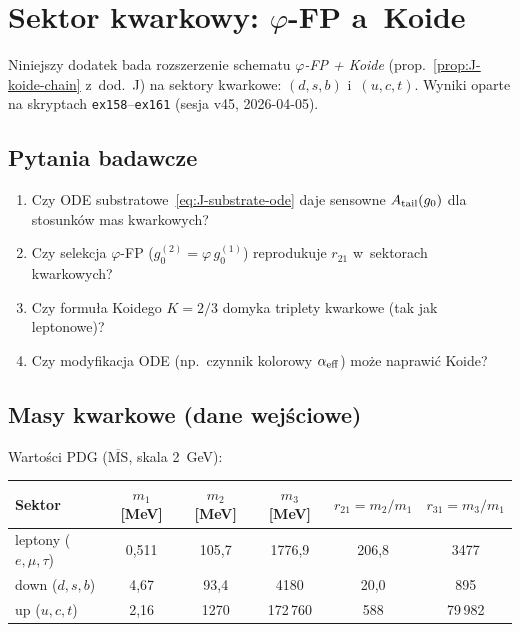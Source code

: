 \section{Sektor kwarkowy: $\varphi$-FP a~Koide}%
\label{app:quark-sector}

Niniejszy dodatek bada rozszerzenie schematu \emph{$\varphi$-FP + Koide}
(prop.~\ref{prop:J-koide-chain} z~dod.~J) na sektory kwarkowe:
$(d, s, b)$ i~$(u, c, t)$.
Wyniki oparte na skryptach \texttt{ex158}--\texttt{ex161}
(sesja v45, 2026-04-05).

\subsection{Pytania badawcze}\label{app:X-pytania}

\begin{enumerate}[nosep]
  \item Czy ODE substratowe~\eqref{eq:J-substrate-ode} daje sensowne
        $A_{\rm tail}(g_0)$ dla stosunków mas kwarkowych?
  \item Czy selekcja $\varphi$-FP ($g_0^{(2)} = \varphi\,g_0^{(1)}$)
        reprodukuje $r_{21}$ w~sektorach kwarkowych?
  \item Czy formuła Koidego $K = 2/3$ domyka triplety kwarkowe
        (tak jak lepton\-owe)?
  \item Czy modyfikacja ODE (np.\ czynnik kolorowy $\alpha_{\rm eff}$)
        może naprawić Koide?
\end{enumerate}

\subsection{Masy kwarkowe (dane wejściowe)}\label{app:X-masy}

Warto\'sci PDG ($\overline{\text{MS}}$, skala 2~GeV):
\begin{center}\footnotesize
\begin{tabular}{@{}lccccc@{}}
\toprule
Sektor & $m_1$ [MeV] & $m_2$ [MeV] & $m_3$ [MeV]
       & $r_{21} = m_2/m_1$ & $r_{31} = m_3/m_1$ \\
\midrule
leptony ($e, \mu, \tau$) & 0,511 & 105,7 & 1776,9 & 206,8 & 3477 \\
down ($d, s, b$)         & 4,67  & 93,4  & 4180   & 20,0  & 895  \\
up ($u, c, t$)           & 2,16  & 1270  & 172\,760 & 588 & 79\,982 \\
\bottomrule
\end{tabular}
\end{center}


